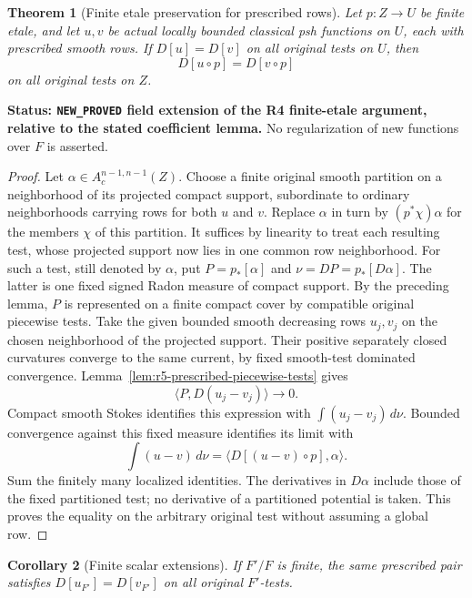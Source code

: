 \documentclass[11pt,a4paper]{article}
\numberwithin{equation}{section}
\newtheorem{theorem}{Theorem}[section]
\newtheorem{corollary}[theorem]{Corollary}
\theoremstyle{definition}
\theoremstyle{remark}
\begin{document}
\begin{theorem}[Finite etale preservation for prescribed rows]
\label{thm:r5-prescribed-finite-etale-kernel}
Let $p:Z\to U$ be finite etale, and let $u,v$ be actual locally
bounded classical psh functions on $U$, each with prescribed smooth
rows. If $D[u]=D[v]$ on all original tests on $U$, then
\[
 D[u\circ p]=D[v\circ p]
\]
on all original tests on $Z$.
\end{theorem}

\noindent\textbf{Status: \texttt{NEW\_PROVED} field extension of
the R4 finite-etale argument, relative to the stated coefficient
lemma.} No regularization of new functions over $F$ is asserted.

\begin{proof}
Let $\alpha\in A_c^{n-1,n-1}(Z)$. Choose a finite original smooth
partition on a neighborhood of its projected compact support,
subordinate to ordinary neighborhoods carrying rows for both
$u$ and $v$. Replace $\alpha$ in turn by
$(p^*\chi)\alpha$ for the members $\chi$ of this partition.
It suffices by linearity to treat each resulting test, whose
projected support now lies in one common row neighborhood.
For such a test, still denoted by $\alpha$, put
$P=p_*[\alpha]$ and $\nu=DP=p_*[D\alpha]$. The latter is one
fixed signed Radon measure of compact support. By the preceding
lemma, $P$ is represented on a finite compact cover by compatible
original piecewise tests. Take the given bounded smooth decreasing
rows $u_j,v_j$ on the chosen neighborhood of the projected
support. Their positive separately closed curvatures converge to
the same current, by fixed smooth-test dominated convergence.
Lemma~\ref{lem:r5-prescribed-piecewise-tests} gives
\[
 \langle P,D(u_j-v_j)\rangle\longrightarrow0.
\]
Compact smooth Stokes identifies this expression with
$\int(u_j-v_j)\,d\nu$. Bounded convergence against this fixed
measure identifies its limit with
\[
 \int(u-v)\,d\nu
      =\langle D[(u-v)\circ p],\alpha\rangle.
\]
Sum the finitely many localized identities. The derivatives in
$D\alpha$ include those of the fixed partitioned test; no derivative
of a partitioned potential is taken. This proves the equality on
the arbitrary original test without assuming a global row.
\end{proof}

\begin{corollary}[Finite scalar extensions]
\label{cor:r5-prescribed-finite-field}
If $F'/F$ is finite, the same prescribed pair satisfies
$D[u_{F'}]=D[v_{F'}]$ on all original $F'$-tests.
\end{corollary}
\end{document}

